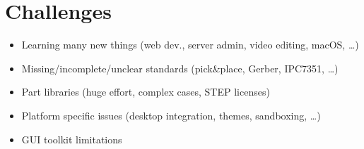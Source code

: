 \section{Challenges}

\begin{frame}{\secname}
  \begin{itemize}
    \item Learning many new things (web dev., server admin, video editing,
          macOS, \ldots)
    \item Missing/incomplete/unclear standards (pick\&place, Gerber, IPC7351,
          \ldots)
    \item Part libraries (huge effort, complex cases, STEP licenses)
    \item Platform specific issues (desktop integration, themes, sandboxing,
          \ldots)
    \item GUI toolkit limitations
  \end{itemize}
\end{frame}
